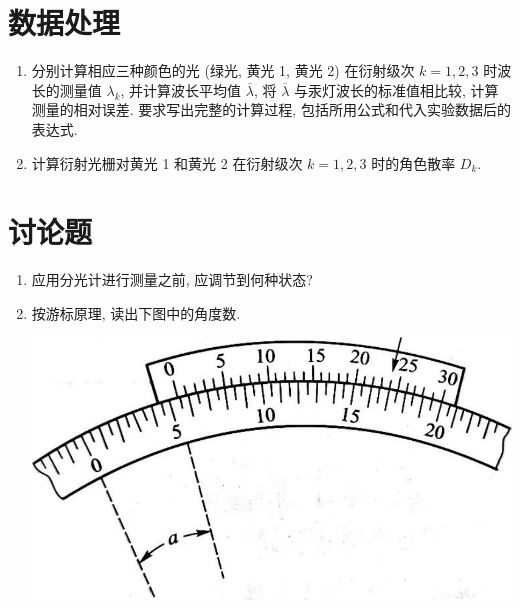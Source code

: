 \documentclass[signature=data]{physicsreport}
\begin{document}
\renewcommand{\arraystretch}{1}

\makeatletter
{}
\makeatother

\newpage
\section{数据处理}
\begin{enumerate}
    \item 分别计算相应三种颜色的光 (绿光, 黄光 1, 黄光 2) 在衍射级次 $k=1,2,3$ 时波长的测量值 $\lambda_k$, 并计算波长平均值 $\overline{\lambda}$, 将 $\overline{\lambda}$ 与汞灯波长的标准值相比较, 计算测量的相对误差. 要求写出完整的计算过程, 包括所用公式和代入实验数据后的表达式.
    \item 计算衍射光栅对黄光 1 和黄光 2 在衍射级次 $k=1,2,3$ 时的角色散率 $D_k$.
\end{enumerate}

\newpage
\section{讨论题}
\begin{enumerate}
    \item 应用分光计进行测量之前, 应调节到何种状态?
    \item 按游标原理, 读出下图中的角度数.
          \par\bigskip\centering\includegraphics[width=.6\textwidth]{images/report-2/Screenshot_20230529_095932.png}
\end{enumerate}
\end{document}
